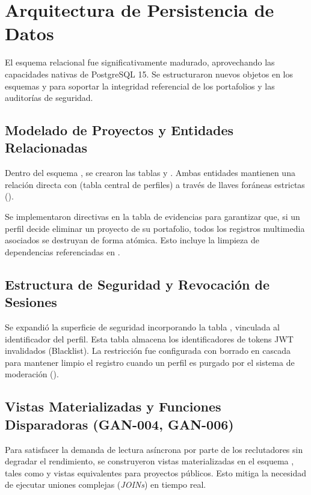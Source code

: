 \section{Arquitectura de Persistencia de Datos}
\label{sec:db_sprint3}

El esquema relacional fue significativamente madurado, aprovechando las capacidades nativas de PostgreSQL 15. Se estructuraron nuevos objetos en los esquemas  y  para soportar la integridad referencial de los portafolios y las auditorías de seguridad.

\subsection{Modelado de Proyectos y Entidades Relacionadas}
Dentro del esquema , se crearon las tablas  y . Ambas entidades mantienen una relación directa con  (tabla central de perfiles) a través de llaves foráneas estrictas (). 

\begin{NotaTecnica}
Se implementaron directivas  en la tabla de evidencias para garantizar que, si un perfil decide eliminar un proyecto de su portafolio, todos los registros multimedia asociados se destruyan de forma atómica. Esto incluye la limpieza de dependencias referenciadas en .
\end{NotaTecnica}

\subsection{Estructura de Seguridad y Revocación de Sesiones}
Se expandió la superficie de seguridad incorporando la tabla , vinculada al identificador del perfil. Esta tabla almacena los identificadores de tokens JWT invalidados (Blacklist). La restricción  fue configurada con borrado en cascada para mantener limpio el registro cuando un perfil es purgado por el sistema de moderación ().

\subsection{Vistas Materializadas y Funciones Disparadoras (GAN-004, GAN-006)}
Para satisfacer la demanda de lectura asíncrona por parte de los reclutadores sin degradar el rendimiento, se construyeron vistas materializadas en el esquema , tales como  y vistas equivalentes para proyectos públicos. Esto mitiga la necesidad de ejecutar uniones complejas (\textit{JOINs}) en tiempo real.

